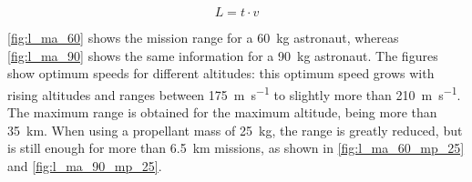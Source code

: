 \documentclass[twocolumn]{article}
\begin{document}
\begin{equation}
  L = t \cdot v
\end{equation}

\autoref{fig:l_ma_60} shows the mission range for a \SI{60}{\kilogram} 
astronaut, whereas \autoref{fig:l_ma_90} shows the same information for a 
\SI{90}{\kilogram} astronaut. The figures show optimum speeds for different 
altitudes: this optimum speed grows with rising altitudes and ranges between 
\SI{175}{\metre\per\second} to slightly more than \SI{210}{\metre\per\second}. 
The maximum range is obtained for the maximum altitude, being more than 
\SI{35}{\kilo\metre}. When using a propellant mass of \SI{25}{\kilogram}, the 
range is greatly reduced, but is still enough for more than 
\SI{6.5}{\kilo\metre} missions, as shown in \autoref{fig:l_ma_60_mp_25} and 
\autoref{fig:l_ma_90_mp_25}.
\end{document}
